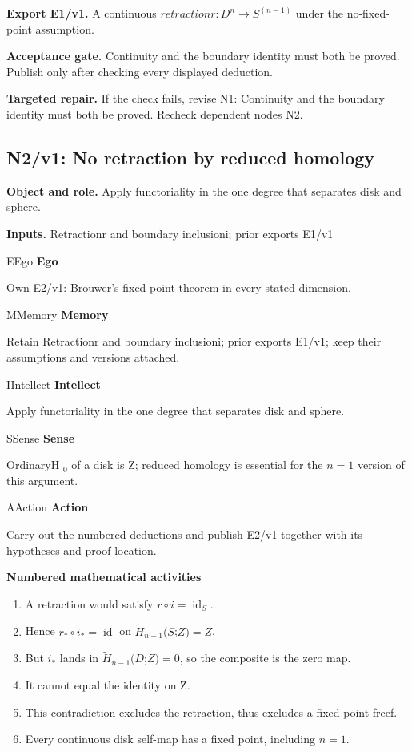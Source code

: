 \documentclass[preprint,12pt,aps,pra,showkeys,amsmath,amssymb,superscriptaddress,floatfix]{revtex4-2}
\theoremstyle{definition}
\theoremstyle{remark}
\newcommand{\mmfaculty}[3]{%
 \begin{mmfacultybox}{#1}{#2}
 {\sffamily\bfseries\color{MMBlue}#2}\par\smallskip #3
 \end{mmfacultybox}}
\newcommand{\field}[2]{\par\smallskip\noindent\textbf{#1.} #2\par}
\begin{document}
\field{Export E1/v1}{A continuous \(retractionr:D^{n}\to S^{(n-1)}\) under the no-fixed-point
assumption.}

\field{Acceptance gate}{Continuity and the boundary identity must both be proved. Publish only
after checking every displayed deduction.}

\field{Targeted repair}{If the check fails, revise N1: Continuity and the boundary identity must
both be proved. Recheck dependent nodes N2.}

\clearpage

\subsection{N2/v1: No retraction by reduced homology}

\field{Object and role}{Apply functoriality in the one degree that separates disk and sphere.}

\field{Inputs}{Retractionr and boundary inclusioni; prior exports E1/v1}

\mmfaculty{E}{Ego}{Own E2/v1: Brouwer's fixed-point theorem in every stated dimension.}

\mmfaculty{M}{Memory}{Retain Retractionr and boundary inclusioni; prior exports E1/v1; keep
their assumptions and versions attached.}

\mmfaculty{I}{Intellect}{Apply functoriality in the one degree that separates disk and sphere.}

\mmfaculty{S}{Sense}{OrdinaryH \(_{0}\) of a disk is Z; reduced homology is essential for the
\(n=1\) version of this argument.}

\mmfaculty{A}{Action}{Carry out the numbered deductions and publish E2/v1 together with its
hypotheses and proof location.}

\smallskip\noindent\textbf{Numbered mathematical activities}

\begin{enumerate}[label=N2.\arabic*,leftmargin=3.4em]

\item A retraction would satisfy \(r\circ i=\operatorname{id} _S\).

\item Hence \(r_*\circ i_*=\operatorname{id}\) on
\(\widetilde H_{n-1}(S\);\(Z)=Z\).

\item But \(i_*\) lands in \(\widetilde H_{n-1}(D\);\(Z)=0\), so the composite
is the zero map.

\item It cannot equal the identity on Z.

\item This contradiction excludes the retraction, thus excludes a
fixed-point-freef.

\item Every continuous disk self-map has a fixed point, including \(n=1\).

\end{enumerate}
\end{document}
